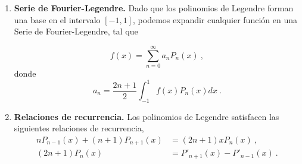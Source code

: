 \begin{propiedad}
\begin{enumerate}
        \item \textbf{Serie de Fourier-Legendre.} Dado que los polinomios de Legendre forman una base en el intervalo $[-1,1]$, podemos expandir cualquier función en una Serie de Fourier-Legendre, tal que
    
        \begin{equation}
            f(x) = \sum_{n=0}^\infty a_n P_n(x) \ ,
        \end{equation}
        donde 
        \begin{equation}
            a_n = \frac{2n+1}{2} \int_{-1}^1 f(x) P_n(x) dx \ .
        \end{equation}
         
        \item \textbf{Relaciones de recurrencia.} Los polinomios de Legendre satisfacen las siguientes relaciones de recurrencia,
        \begin{align}
            n P_{n-1}(x) + (n+1) P_{n+1}(x) & = (2n+1) x P_n(x) \ , \\
            (2n+1) P_n(x) & = P'_{n+1}(x) - P'_{n-1}(x) \ .
        \end{align}    
    \end{enumerate}
\end{propiedad}

